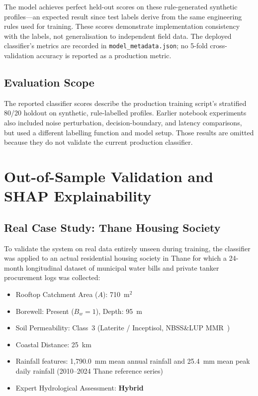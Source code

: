 ﻿\documentclass[conference]{IEEEtran}
\begin{document}
The model achieves perfect held-out scores on these rule-generated synthetic profiles---an expected result since test labels derive from the same engineering rules used for training. These scores demonstrate implementation consistency with the labels, not generalisation to independent field data. The deployed classifier's metrics are recorded in \texttt{model\_metadata.json}; no 5-fold cross-validation accuracy is reported as a production metric.

\subsection{Evaluation Scope}
The reported classifier scores describe the production training script's stratified 80/20 holdout on synthetic, rule-labelled profiles. Earlier notebook experiments also included noise perturbation, decision-boundary, and latency comparisons, but used a different labelling function and model setup. Those results are omitted because they do not validate the current production classifier.

\section{Out-of-Sample Validation and SHAP Explainability}
\label{sec:shap}

\subsection{Real Case Study: Thane Housing Society}

To validate the system on real data entirely unseen during training, the classifier was applied to an actual residential housing society in Thane for which a 24-month longitudinal dataset of municipal water bills and private tanker procurement logs was collected:
\begin{itemize}
  \item Rooftop Catchment Area ($A$): 710~m$^2$
  \item Borewell: Present ($B_w = 1$), Depth: 95~m
  \item Soil Permeability: Class~3 (Laterite / Inceptisol, NBSS\&LUP MMR~\cite{nbsslup})
  \item Coastal Distance: 25~km
  \item Rainfall features: 1,790.0~mm mean annual rainfall and 25.4~mm mean peak daily rainfall (2010--2024 Thane reference series)
  \item Expert Hydrological Assessment: \textbf{Hybrid}
\end{itemize}
\end{document}
